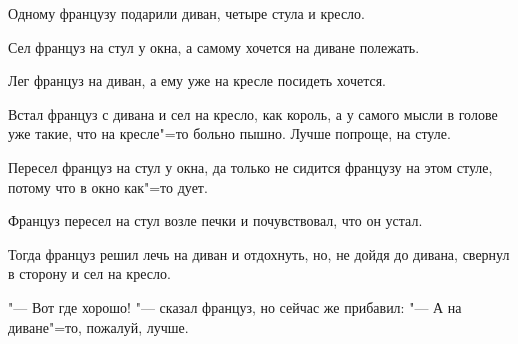 Одному  французу подарили диван,  четыре
стула и кресло.

    Сел француз на стул у окна, а самому хочется на диване полежать.

    Лег француз на диван, а ему уже на кресле посидеть хочется.

    Встал француз с  дивана и сел на кресло,
как король, а у самого  мысли  в голове  уже
такие, что на кресле"=то больно пышно.  Лучше
попроще, на стуле.

    Пересел француз на стул у окна, да только не сидится французу на этом стуле, потому
что в окно как"=то дует.

    Француз  пересел  на стул возле печки  и
почувствовал, что он устал.

    Тогда  француз решил лечь на диван и отдохнуть,  но, не дойдя до дивана,  свернул в
сторону и сел на кресло.

     "---   Вот где хорошо!   "---  сказал француз, но
сейчас же прибавил:   "---  А на диване"=то, пожалуй, лучше.

